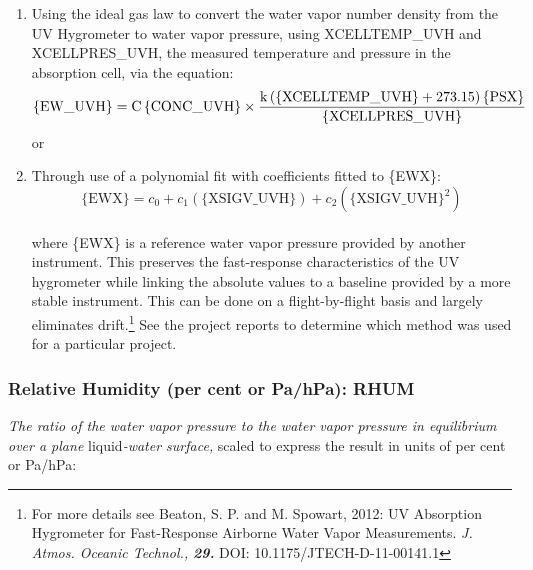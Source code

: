 \documentclass[
]{book}
\providecommand{\tightlist}{%
  \setlength{\itemsep}{0pt}\setlength{\parskip}{0pt}}
\begin{document}
\begin{enumerate}
\def\labelenumi{\arabic{enumi}.}
\tightlist
\item
  Using the ideal gas law to convert the water vapor number density from the UV Hygrometer to water vapor pressure, using XCELLTEMP\_UVH and XCELLPRES\_UVH, the measured temperature and pressure in the absorption cell, via the equation:\\
  \begin{equation}
  \mathrm{\{EW\_UVH\}=C\,\{CONC\_UVH\}\notag \\
  \times\frac{k\,(\mathrm{\{XCELLTEMP\_UVH\}+273.15)\,\mathrm{\{PSX\}}}}{\mathrm{{\{XCELLPRES\_UVH\}}}}}
  \label{eq:UVH1}
  \end{equation}
  or\\
\item
  Through use of a polynomial fit with coefficients fitted to \{EWX\}:\\
  \begin{equation}
  \mathrm{\{EWX\}}=c_0 + c_1(\mathrm{\{XSIGV\_UVH\}}) + c_2(\mathrm{\{XSIGV\_UVH\}}^2)
  \label{eq:UVH2}
  \end{equation}\\
  where \{EWX\} is a reference water vapor pressure provided by another instrument. This preserves the fast-response characteristics of the UV hygrometer while linking the absolute values to a baseline provided by a more stable instrument. This can be done on a flight-by-flight basis and largely eliminates drift.\footnote{For more details see Beaton, S. P. and M. Spowart, 2012: UV Absorption Hygrometer for Fast-Response Airborne Water Vapor Measurements. \emph{J. Atmos. Oceanic Technol.,} \textbf{\emph{29.}} DOI: 10.1175/JTECH-D-11-00141.1}
  See the project reports to determine which method was used for a particular project.
\end{enumerate}

\hypertarget{rhumw}{%
\subsubsection*{Relative Humidity (per cent or Pa/hPa): RHUM}\label{rhumw}}

\emph{The ratio of the water vapor pressure to the water vapor pressure in equilibrium over a plane} liquid\emph{-water surface,} scaled to express the result in units of per cent or Pa/hPa:
\end{document}
